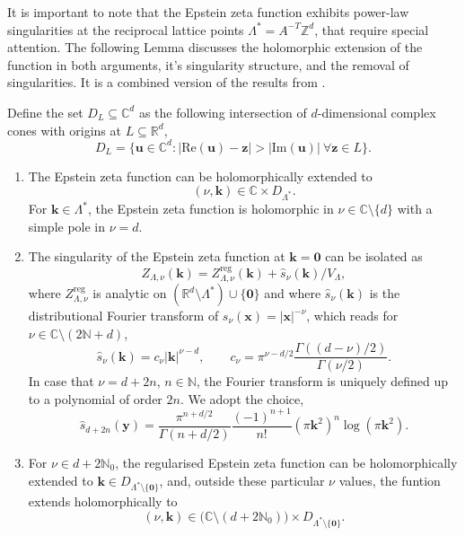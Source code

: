 \documentclass[]{amsart}
\numberwithin{mythm}{section}
\renewcommand{\Re}[1]{\mathrm{Re}(#1)}
\renewcommand{\Im}[1]{\mathrm{Im}(#1)}
\begin{document}
It is important to note that the Epstein zeta function exhibits power-law singularities at the reciprocal lattice points $\Lambda^\ast = A^{-T}\mathds Z^d$, that require special attention. The following Lemma discusses the holomorphic extension of the function in both arguments, it's singularity structure, and the removal of singularities. It is a combined version of the results from \cite[Theorems 2.14, 2.18]{buchheit2024epstein}.
\begin{lemma}
    \label{lem:holomorphy}
    Define the set $D_L\subseteq \mathds C^d$ as the  following intersection of $d$-dimensional complex cones with origins at $L\subseteq \mathds R^d$,
$$
D_L=\{\bm u\in\mathds C^d:|\Re{\bm u}-\bm z|>|\Im{\bm u}|\ \forall \bm z\in L\}.
$$
\begin{enumerate} \item The Epstein zeta function can be holomorphically extended to  
$$
(\nu,\bm k)\in 
\mathds C\times D_{\Lambda^*}.
$$
For $\bm k\in\Lambda^*$, the Epstein zeta function is holomorphic in $\nu\in\mathds C\setminus\{d\}$ with a simple pole in $\nu=d$.  

\item The singularity of the Epstein zeta function at $\bm k=\bm 0$ can be isolated as
    \[
    Z_{\Lambda,\nu}(\bm k) = Z_{\Lambda,\nu}^{\mathrm{reg}}(\bm k)+\hat s_\nu(\bm k)/V_\Lambda,
    \]
    where $Z_{\Lambda,\nu}^{\mathrm{reg}}$ is analytic on $(\mathds R^d\setminus \Lambda^\ast)\cup \{\bm 0\}$ and where $\hat s_\nu(\bm k)$ is the distributional Fourier transform of $s_\nu(\bm x)=\vert \bm x\vert^{-\nu}$, which reads for $\nu\in \mathds C\setminus (2\mathds N +d)$,
    \[
    \hat s_\nu(\bm k) = c_\nu \vert \bm k\vert^{\nu-d},\qquad c_\nu=\pi^{\nu-d/2}\frac{ \Gamma ((d-\nu)/2)}{\Gamma(\nu/2) }.
    \]
    In case that $\nu=d+2n$, $n\in \mathds N$, the Fourier transform is uniquely defined up to a polynomial of order $2n$. We adopt the choice,
\[\hat s_{d+2n}(\bm y)= \frac{\pi^{n+d/2}}{\Gamma(n+d/2)}\frac{(-1)^{n+1}}{n!} ( \pi \bm k^2 )^{n} \log (\pi  \bm k^{2}).
    \]
\item For $\nu\in d+2 \mathds N_0$, the regularised Epstein zeta function can be holomorphically extended to  $\bm k \in D_{\Lambda^\ast\setminus\{\bm 0\}}$,
and, outside these particular $\nu$ values, the funtion extends holomorphically to
\[
(\nu,\bm k) \in \big(\mathds C\setminus (d+2\mathds N_0)\big)\times D_{\Lambda^\ast\setminus\{\bm 0\}}.
\]
\end{enumerate}
\end{lemma}  
\end{document}
